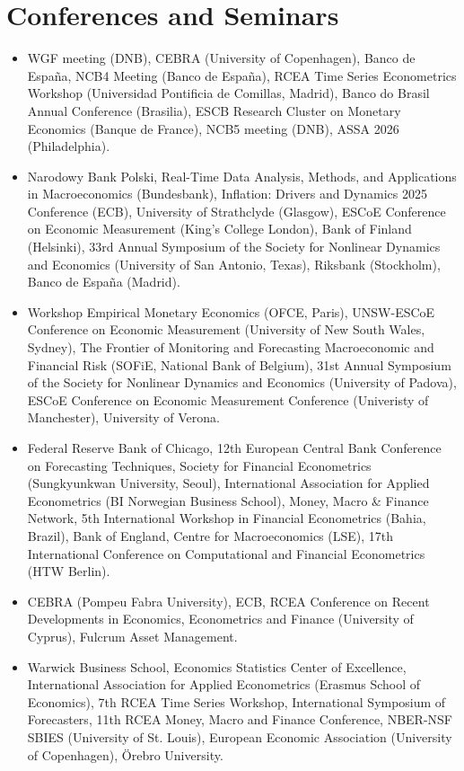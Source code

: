 \documentclass[a4paper,11pt]{article}
\begin{document}
\section{Conferences and Seminars} \begin{itemize}
    \item[2026:] WGF meeting (DNB), CEBRA (University of Copenhagen), Banco de Espa\~na, NCB4 Meeting (Banco de Espa\~na), RCEA Time Series Econometrics Workshop (Universidad Pontificia de Comillas, Madrid), Banco do Brasil Annual Conference (Brasilia), ESCB Research Cluster on Monetary Economics (Banque de France), NCB5 meeting (DNB), ASSA 2026 (Philadelphia).
    \item[2025:] Narodowy Bank Polski, Real-Time Data Analysis, Methods, and Applications in Macroeconomics (Bundesbank), Inflation: Drivers and Dynamics 2025 Conference (ECB), University of Strathclyde (Glasgow), ESCoE Conference on Economic Measurement (King's College London), Bank of Finland (Helsinki), 33rd Annual Symposium of the Society for Nonlinear Dynamics and Economics (University of San Antonio, Texas), Riksbank (Stockholm), Banco de Espa\~na (Madrid). 
    \item[2024:] Workshop Empirical Monetary Economics (OFCE, Paris), UNSW-ESCoE Conference on Economic Measurement (University of New South Wales, Sydney), The Frontier of Monitoring and Forecasting Macroeconomic and Financial Risk (SOFiE, National Bank of Belgium), 31st Annual Symposium of the Society for Nonlinear Dynamics and Economics (University of Padova), ESCoE Conference on Economic Measurement Conference (Univeristy of Manchester), University of Verona.
    \item[2023:] Federal Reserve Bank of Chicago, 12th European Central Bank Conference on Forecasting Techniques, Society for Financial Econometrics (Sungkyunkwan University, Seoul), International Association for Applied Econometrics (BI Norwegian Business School), Money, Macro \& Finance Network, 5th International Workshop in Financial Econometrics (Bahia, Brazil), Bank of England, Centre for Macroeconomics (LSE), 17th International Conference on Computational and Financial Econometrics (HTW Berlin). 
    \item[2022:] CEBRA (Pompeu Fabra University), ECB, RCEA Conference on Recent Developments in Economics, Econometrics and Finance (University of Cyprus), Fulcrum Asset Management.
    \item[2021:] Warwick Business School, Economics Statistics Center of Excellence, International Association for Applied Econometrics (Erasmus School of Economics), 7th RCEA Time Series Workshop, International Symposium of Forecasters, 11th RCEA Money, Macro and Finance Conference, NBER-NSF SBIES (University of St. Louis), European Economic Association (University of Copenhagen), \"Orebro University.

\end{itemize}
\end{document}
